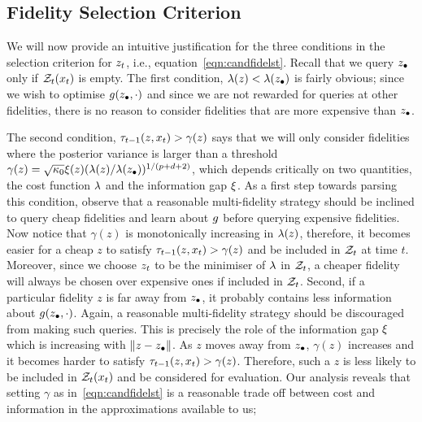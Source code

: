 \insertAlgoMFGPUCBTwo

\subsection{Fidelity Selection Criterion}
\label{sec:fidelSelection}

We will now provide an intuitive justification for the three conditions in the
 selection criterion for $z_t$, i.e., equation~\eqref{eqn:candfidelst}.
Recall that we query $z_{\bullet}$ only if $\mathcal{Z}_t(x_t)$ is empty.
The first condition, $\lambda(z) < \lambda(z_{\bullet})$ is fairly obvious;
since we wish to optimise $g(z_{\bullet}, \cdot)$ and since we are not rewarded for queries at
other fidelities, there
is no reason to consider fidelities that are more expensive than $z_{\bullet}$. 

The second condition, $\tau_{t-1}(z,x_t) > \gamma(z)$ says that we will only consider
fidelities where the posterior
variance is larger than a threshold
$\gamma(z) = \sqrt{\kappa_0}\xi(z)(\lambda(z)/\lambda(z_{\bullet}))^{1/(p+d+2)}$,
 which depends critically on two
quantities, the cost function $\lambda$ and the information gap $\xi$. As a first step towards parsing this condition, observe that a reasonable multi-fidelity strategy should be inclined to query cheap
fidelities and learn about $g$ before querying expensive fidelities.
Now notice that $\gamma(z)$ is monotonically increasing in $\lambda(z)$, therefore, it becomes
easier for a cheap $z$ to satisfy $\tau_{t-1}(z,x_t)>\gamma(z)$ and be included in
$\mathcal{Z}_t$ at time $t$. Moreover, since we choose $z_t$ to be the minimiser of $\lambda$ in $\mathcal{Z}_t$,
a cheaper fidelity will always be chosen over expensive ones if included in $\mathcal{Z}_t$. 
Second, if a particular fidelity $z$ is far away from $z_{\bullet}$, it probably contains less information
about $g(z_{\bullet},\cdot)$. Again, a reasonable multi-fidelity strategy should be discouraged from making such queries. 
This is precisely the role of the information gap $\xi$ which is increasing with
$\|z-z_{\bullet}\|$.
As $z$ moves away from $z_{\bullet}$, $\gamma(z)$ increases and
it becomes harder to satisfy $\tau_{t-1}(z,x_t)>\gamma(z)$.
Therefore, such a $z$ is less likely
to be included in $\mathcal{Z}_t(x_t)$ and be considered for evaluation.
Our analysis reveals that setting $\gamma$ as in~\eqref{eqn:candfidelst} is a reasonable
trade off between cost and information in the approximations available to us; 
